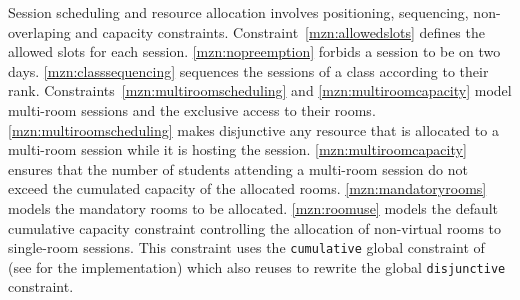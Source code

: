 
%
Session scheduling and resource allocation involves positioning, sequencing, non-overlaping and capacity constraints.
Constraint~\ref{mzn:allowedslots} defines the allowed slots for each session.
\ref{mzn:nopreemption} forbids a session to be on two days.
\ref{mzn:classsequencing} sequences the sessions of a class according to their rank.
Constraints~\ref{mzn:multiroomscheduling} and \ref{mzn:multiroomcapacity} model multi-room sessions and the exclusive access to their rooms.
\ref{mzn:multiroomscheduling} makes disjunctive any resource that is allocated to a multi-room session while it is hosting the session.
\ref{mzn:multiroomcapacity} ensures that the number of students attending a multi-room session do not exceed the cumulated capacity of the allocated rooms.
\ref{mzn:mandatoryrooms} models the mandatory rooms to be allocated.
\ref{mzn:roomuse} models the default cumulative capacity constraint controlling the allocation of non-virtual rooms to single-room sessions.
This constraint uses the \texttt{cumulative} global constraint of \MINIZINC{} (see \cite{2002_beldiceanu_CP} for the \GECODE{} implementation)
which \MINIZINC{} also reuses to rewrite the global \texttt{disjunctive} constraint. 

